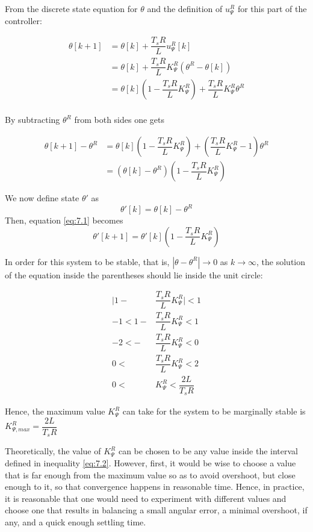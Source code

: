 From the discrete state equation for $\theta$ and the definition of
$u_{\Psi}^R$ for this part of the controller:

\begin{align*}
  \theta[k+1] &= \theta[k] + \dfrac{T_s R}{L} u_{\Psi}^R[k]  \\
            ~ &= \theta[k] + \dfrac{T_s R}{L} K_{\Psi}^R (\theta^R - \theta[k]) \\
            ~ &= \theta[k](1 - \dfrac{T_s R}{L} K_{\Psi}^R) + \dfrac{T_s R}{L} K_{\Psi}^R \theta^R  \\
\end{align*}

By subtracting $\theta^R$ from both sides one gets

\begin{align}
  \theta[k+1] - \theta^R &= \theta[k](1 - \dfrac{T_s R}{L} K_{\Psi}^R) + (\dfrac{T_s R}{L} K_{\Psi}^R - 1) \theta^R \nonumber \\
                     ~ &= (\theta[k] - \theta^R)(1 - \dfrac{T_s R}{L} K_{\Psi}^R) \label{eq:7.1}
\end{align}

We now define state $\theta'$ as
$$\theta'[k] = \theta[k] - \theta^R$$
Then, equation \ref{eq:7.1} becomes
$$\theta'[k+1] = \theta'[k](1 - \dfrac{T_s R}{L} K_{\Psi}^R)$$

In order for this system to be stable, that is, $| \theta - \theta^R | \rightarrow 0$
as $k \rightarrow \infty$, the solution of the equation inside the parentheses
should lie inside the unit circle:

\begin{align}
  \Big|1 - &\dfrac{T_s R}{L} K_{\Psi}^R\Big| < 1 \nonumber \\
  -1 < 1 - &\dfrac{T_s R}{L} K_{\Psi}^R < 1 \nonumber \\
  -2 < - &\dfrac{T_s R}{L} K_{\Psi}^R < 0 \nonumber \\
   0 <\ &\dfrac{T_s R}{L} K_{\Psi}^R < 2 \nonumber \\
   0 <\ &K_{\Psi}^R < \dfrac{2L}{T_s R} \label{eq:7.2}
\end{align}

Hence, the maximum value $K_{\Psi}^R$ can take for the system to be marginally
stable is $K_{\Psi,max}^R = \dfrac{2L}{T_s R}$

Theoretically, the value of $K_{\Psi}^R$ can be chosen to be any value inside
the interval defined in inequality \ref{eq:7.2}. However, first, it would be
wise to choose a value that is far enough from the maximum value so as to avoid
overshoot, but close enough to it, so that convergence happens in reasonable
time. Hence, in practice, it is reasonable that one would need to experiment
with different values and choose one that results in balancing a small angular
error, a minimal overshoot, if any, and a quick enough settling time.

